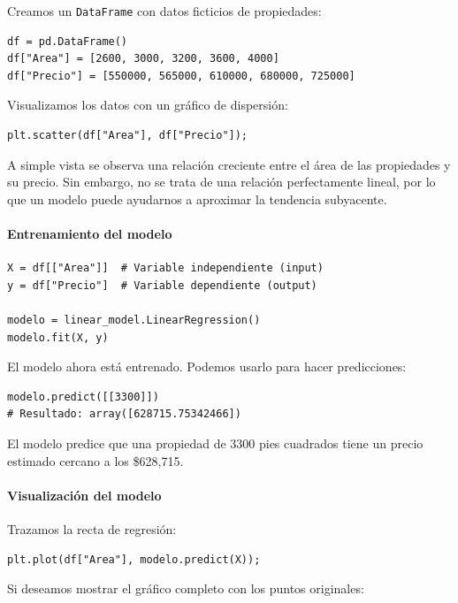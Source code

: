 \documentclass{article}
\theoremstyle{nonumberplain}
\begin{document}
Creamos un \texttt{DataFrame} con datos ficticios de propiedades:

\begin{verbatim}
df = pd.DataFrame()
df["Area"] = [2600, 3000, 3200, 3600, 4000]
df["Precio"] = [550000, 565000, 610000, 680000, 725000]
\end{verbatim}

Visualizamos los datos con un gráfico de dispersión:

\begin{verbatim}
plt.scatter(df["Area"], df["Precio"]);
\end{verbatim}

A simple vista se observa una relación creciente entre el área de las propiedades y su precio. Sin embargo, no se trata de una relación perfectamente lineal, por lo que un modelo puede ayudarnos a aproximar la tendencia subyacente.

\paragraph{Entrenamiento del modelo}

\begin{verbatim}
X = df[["Area"]]  # Variable independiente (input)
y = df["Precio"]  # Variable dependiente (output)

modelo = linear_model.LinearRegression()
modelo.fit(X, y)
\end{verbatim}

El modelo ahora está entrenado. Podemos usarlo para hacer predicciones:

\begin{verbatim}
modelo.predict([[3300]])
# Resultado: array([628715.75342466])
\end{verbatim}

El modelo predice que una propiedad de 3300 pies cuadrados tiene un precio estimado cercano a los \$628,715.

\paragraph{Visualización del modelo}

Trazamos la recta de regresión:

\begin{verbatim}
plt.plot(df["Area"], modelo.predict(X));
\end{verbatim}

Si deseamos mostrar el gráfico completo con los puntos originales:
\end{document}
